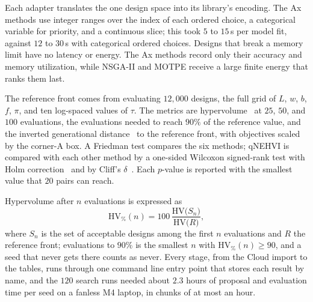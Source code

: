 Each adapter translates the one design space into its library's encoding.
The Ax methods use integer ranges over the index of each ordered choice,
a categorical variable for priority, and a continuous slice; this took $5$ to
$15$\,s per model fit, against $12$ to $30$\,s with categorical ordered
choices. Designs that break a memory limit have no latency or energy. The
Ax methods record only their accuracy and memory utilization, while
NSGA-II and MOTPE receive a large finite energy that ranks them last.

The reference front comes from evaluating $12{,}000$ designs, the full grid of
$L$, $w$, $b$, $f$, $\pi$, and ten log-spaced values of $\tau$. The metrics
are hypervolume~\cite{guerreiro2022hypervolume} at $25$, $50$, and $100$
evaluations, the evaluations needed to reach $90\%$ of the reference value,
and the inverted generational distance~\cite{cai2021igd} to the reference
front, with objectives scaled by the corner-A box. A Friedman test compares
the six methods; qNEHVI is compared with each other method by a one-sided
Wilcoxon signed-rank test with Holm correction~\cite{carrasco2020stats} and by Cliff's
$\delta$~\cite{ismail2026stats}. Each $p$-value is reported with the smallest
value that $20$ pairs can reach.

Hypervolume after $n$ evaluations is expressed as
\begin{equation}
\mathrm{HV}_\%(n)=100\,\frac{\mathrm{HV}\bigl(S_n\bigr)}{\mathrm{HV}\bigl(R\bigr)},
\label{eq:hv}
\end{equation}
where $S_n$ is the set of acceptable designs among the first $n$ evaluations and
$R$ the reference front; evaluations to $90\%$ is the smallest $n$ with
$\mathrm{HV}_\%(n)\geq90$, and a seed that never gets there counts as never.
Every stage, from the Cloud import to the tables, runs through one command
line entry point that stores each result by name, and the $120$ search runs
needed about $2.3$ hours of proposal and evaluation time per seed on a
fanless M4 laptop, in chunks of at most an hour.
